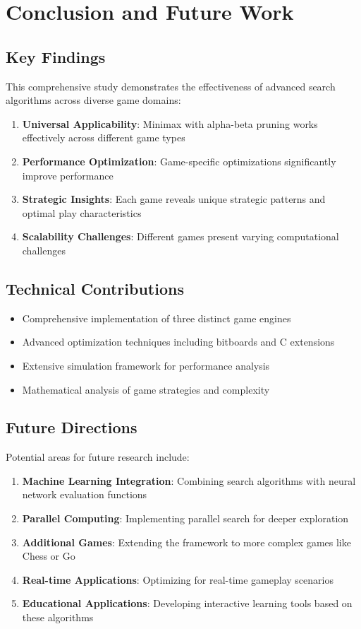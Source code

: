 \documentclass[12pt]{article}
\begin{document}
\section{Conclusion and Future Work}

\subsection{Key Findings}

This comprehensive study demonstrates the effectiveness of advanced search algorithms across diverse game domains:

\begin{enumerate}
    \item \textbf{Universal Applicability}: Minimax with alpha-beta pruning works effectively across different game types
    \item \textbf{Performance Optimization}: Game-specific optimizations significantly improve performance
    \item \textbf{Strategic Insights}: Each game reveals unique strategic patterns and optimal play characteristics
    \item \textbf{Scalability Challenges}: Different games present varying computational challenges
\end{enumerate}

\subsection{Technical Contributions}

\begin{itemize}
    \item Comprehensive implementation of three distinct game engines
    \item Advanced optimization techniques including bitboards and C extensions
    \item Extensive simulation framework for performance analysis
    \item Mathematical analysis of game strategies and complexity
\end{itemize}

\subsection{Future Directions}

Potential areas for future research include:

\begin{enumerate}
    \item \textbf{Machine Learning Integration}: Combining search algorithms with neural network evaluation functions
    \item \textbf{Parallel Computing}: Implementing parallel search for deeper exploration
    \item \textbf{Additional Games}: Extending the framework to more complex games like Chess or Go
    \item \textbf{Real-time Applications}: Optimizing for real-time gameplay scenarios
    \item \textbf{Educational Applications}: Developing interactive learning tools based on these algorithms
\end{enumerate}
\end{document}
